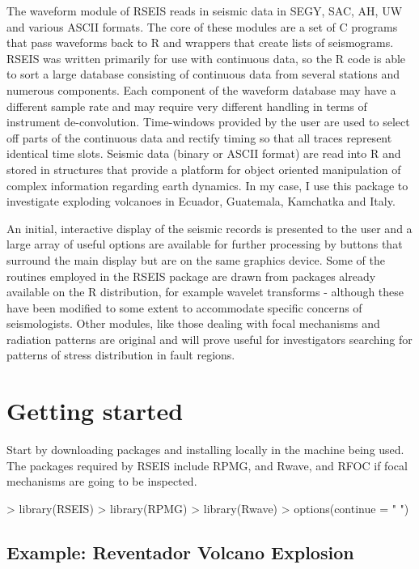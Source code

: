 \documentclass{article}
\begin{document}
The waveform module of RSEIS reads in seismic data in SEGY, SAC, AH,
UW and various ASCII formats.  The core of these modules are a set of
C programs that pass waveforms back to R and wrappers that create
lists of seismograms.  RSEIS was written primarily for use with
continuous data, so the R code is able to sort a large database
consisting of continuous data from several stations and numerous
components.  Each component of the waveform database may have a
different sample rate and may require very different handling in terms
of instrument de-convolution.  Time-windows provided by the user are
used to select off parts of the continuous data and rectify timing so
that all traces represent identical time slots.  Seismic data (binary
or ASCII format) are read into R and stored in structures that provide
a platform for object oriented manipulation of complex information
regarding earth dynamics.  In my case, I use this package to
investigate exploding volcanoes in Ecuador, Guatemala, Kamchatka and
Italy.

An initial, interactive display of the seismic records is presented to
the user and a large array of useful options are available for further
processing by buttons that surround the main display but are on the
same graphics device.  Some of the routines employed in the RSEIS
package are drawn from packages already available on the R
distribution, for example wavelet transforms - although these have
been modified to some extent to accommodate specific concerns of
seismologists. Other modules, like those dealing with focal mechanisms
and radiation patterns are original and will prove useful for
investigators searching for patterns of stress distribution in fault
regions.  


\section{Getting started}

Start by downloading packages and installing locally in the
machine being used.
The packages required by RSEIS include RPMG, and Rwave, 
and RFOC if focal mechanisms are going to be inspected.

\begin{Schunk}
\begin{Sinput}
> library(RSEIS)
> library(RPMG)
> library(Rwave)
> options(continue = " ")
\end{Sinput}
\end{Schunk}

\subsection{Example: Reventador Volcano Explosion }
\end{document}
